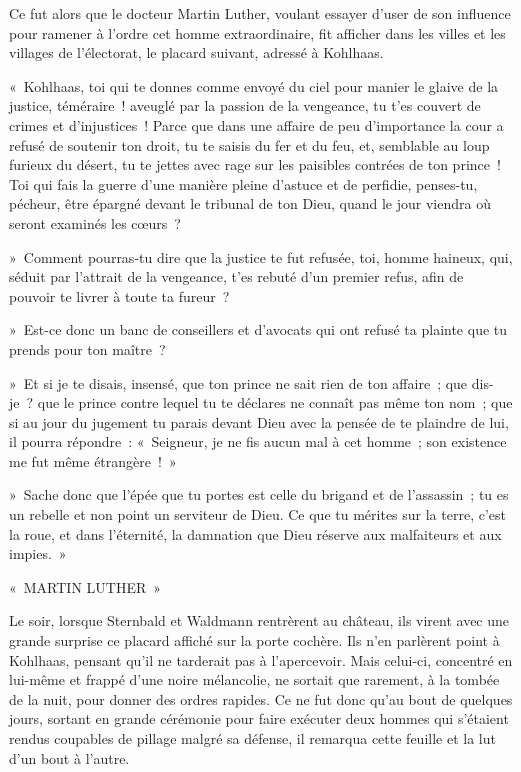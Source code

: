 \documentclass[french,twoside]{book} %
\newcommand\chaptercont{} %
\begin{document}
\chaptercont
\noindent Ce fut alors que le docteur Martin Luther, voulant essayer d’user de son influence pour ramener à l’ordre cet homme extraordinaire, fit afficher dans les villes et les villages de l’électorat, le placard suivant, adressé à Kohlhaas.\par
« Kohlhaas, toi qui te donnes comme envoyé du ciel pour manier le glaive de la justice, téméraire ! aveuglé par la passion de la vengeance, tu t’es couvert de crimes et d’injustices ! Parce que dans une affaire de peu d’importance la cour a refusé de soutenir ton droit, tu te saisis du fer et du feu, et, semblable au loup furieux du désert, tu te jettes avec rage sur les paisibles contrées de ton prince ! Toi qui fais la guerre d’une manière pleine d’astuce et de perfidie, penses-tu, pécheur, être épargné devant le tribunal de ton Dieu, quand le jour viendra où seront examinés les cœurs ?\par
» Comment pourras-tu dire que la justice te fut refusée, toi, homme haineux, qui, séduit par l’attrait de la vengeance, t’es rebuté d’un premier refus, afin de pouvoir te livrer à toute ta fureur ?\par
» Est-ce donc un banc de conseillers et d’avocats qui ont refusé ta plainte que tu prends pour ton maître ?\par
» Et si je te disais, insensé, que ton prince ne sait rien de ton affaire ; que dis-je ? que le prince contre lequel tu te déclares ne connaît pas même ton nom ; que si au jour du jugement tu parais devant Dieu avec la pensée de te plaindre de lui, il pourra répondre : « Seigneur, je ne fis aucun mal à cet homme ; son existence me fut même étrangère ! »\par
» Sache donc que l’épée que tu portes est celle du brigand et de l’assassin ; tu es un rebelle et non point un serviteur de Dieu. Ce que tu mérites sur la terre, c’est la roue, et dans l’éternité, la damnation que Dieu réserve aux malfaiteurs et aux impies. »\par
« MARTIN LUTHER »\par
Le soir, lorsque Sternbald et Waldmann rentrèrent au château, ils virent avec une grande surprise ce placard affiché sur la porte cochère. Ils n’en parlèrent point à Kohlhaas, pensant qu’il ne tarderait pas à l’apercevoir. Mais celui-ci, concentré en lui-même et frappé d’une noire mélancolie, ne sortait que rarement, à la tombée de la nuit, pour donner des ordres rapides. Ce ne fut donc qu’au bout de quelques jours, sortant en grande cérémonie pour faire exécuter deux hommes qui s’étaient rendus coupables de pillage malgré sa défense, il remarqua cette feuille et la lut d’un bout à l’autre.\par
\end{document}
